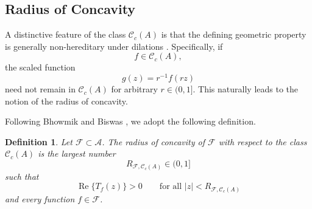 \documentclass[10pt,a4paper]{amsart}
\newtheorem{definition}[theorem]{Definition}
\renewcommand{\Re}{\operatorname{Re}}
\begin{document}
\subsection{Radius of Concavity}

A distinctive feature of the class $\mathcal{C}_c(A)$ is that the defining geometric property is generally non-hereditary under dilations \cite{pm7}. Specifically, if
\[
f\in\mathcal{C}_c(A),
\]
the scaled function
\[
g(z)=r^{-1}f(rz)
\]
need not remain in $\mathcal{C}_c(A)$ for arbitrary $r\in(0,1]$. This naturally leads to the notion of the radius of concavity.

Following Bhowmik and Biswas \cite{pm7}, we adopt the following definition.

\begin{definition}
Let $\mathcal{F}\subset\mathcal{A}$. The radius of concavity of $\mathcal{F}$ with respect to the class $\mathcal{C}_c(A)$ is the largest number
\[
R_{\mathcal{F},\mathcal{C}_c(A)}\in(0,1]
\]
such that
\begin{equation}\label{pm2}
\Re\{T_f(z)\}>0
\qquad
\text{for all }
|z|<R_{\mathcal{F},\mathcal{C}_c(A)}
\end{equation}
and every function $f\in\mathcal{F}$.
\end{definition}
\end{document}
